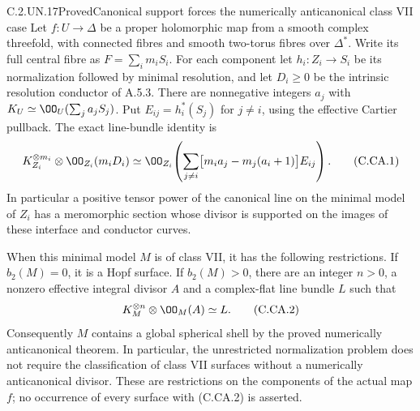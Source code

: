 \begin{statement}{C.2.UN.17}{Proved}{Canonical support forces the numerically anticanonical class VII case}
Let $f:U\to\Delta$ be a proper holomorphic map from a smooth
complex threefold, with connected fibres and smooth two-torus
fibres over $\Delta^*$. Write its full central fibre as
$F=\sum_i m_iS_i$. For each component let
$h_i:Z_i\to S_i$ be its normalization followed by minimal
resolution, and let $D_i\ge0$ be the intrinsic resolution
conductor of A.5.3. There are nonnegative integers $a_j$ with
$K_U\simeq\OO_U(\sum_j a_jS_j)$. Put
$E_{ij}=h_i^*(S_j)$ for $j\ne i$, using the effective
Cartier pullback. The exact line-bundle identity is
\[
 K_{Z_i}^{\otimes m_i}\otimes\OO_{Z_i}(m_iD_i)
 \simeq
 \OO_{Z_i}\!\left(
  \sum_{j\ne i}\bigl[m_i a_j-m_j(a_i+1)\bigr]E_{ij}
 \right).                                                \tag{C.CA.1}
\]
In particular a positive tensor power of the canonical line on the minimal
model of $Z_i$ has a meromorphic section whose divisor is
supported on the images of these interface and conductor
curves.

When this minimal model $M$ is of class VII, it has the
following restrictions. If $b_2(M)=0$, it is a Hopf surface.
If $b_2(M)>0$, there are an integer $n>0$, a nonzero
effective integral divisor $A$ and a complex-flat line
bundle $L$ such that
\[
                 K_M^{\otimes n}\otimes\OO_M(A)
                         \simeq L.                       \tag{C.CA.2}
\]
Consequently $M$ contains a global spherical shell by the
proved numerically anticanonical theorem. In particular,
the unrestricted normalization problem does not require
the classification of class VII surfaces without a
numerically anticanonical divisor. These are restrictions
on the components of the actual map $f$; no occurrence of
every surface with (C.CA.2) is asserted.
\end{statement}
